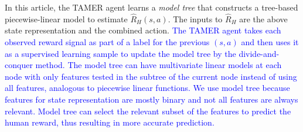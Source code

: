 In this article, %
the TAMER agent learns a \emph{model tree} \cite{wang1996induction} that constructs a tree-based %
piecewise-linear model to estimate $\hat{R}_{H}(s, a)$.  
The inputs to $\hat{R}_{H}$ are the above state representation %
and the combined action. %
\textcolor{blue}{The TAMER agent takes each observed reward signal as part of a label for the previous $(s,a)$ and then uses it as a supervised learning sample to update the model tree by the divide-and-conquer method. The model tree can have multivariate linear models at each node with only features tested in the subtree of the current node instead of using all features, analogous to piecewise linear functions. We use model tree because features for state representation are mostly binary and not all features are always relevant. Model tree can select the relevant subset of the features to predict the human reward, thus resulting in more accurate prediction.}

